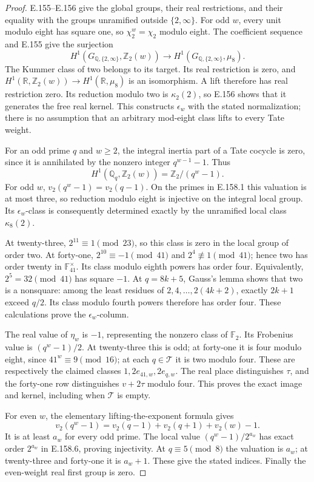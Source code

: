 \begin{proof}
E.155--E.156 give the global groups, their real restrictions,
and their equality with the groups unramified outside
\(\{2,\infty\}\). For odd \(w\), every unit modulo eight
has square one, so \(\chi_2^w=\chi_2\) modulo eight.
The coefficient sequence and E.155 give the surjection
\[
 H^1(G_{\mathbb Q,\{2,\infty\}},\mathbb Z_2(w))
       \longrightarrow
 H^1(G_{\mathbb Q,\{2,\infty\}},\mu_8).
 \tag{E.158.5}
\]
The Kummer class of two belongs to its target. Its real
restriction is zero, and
\(H^1(\mathbb R,\mathbb Z_2(w))\to H^1(\mathbb R,\mu_8)\)
is an isomorphism. A lift therefore has real restriction
zero. Its reduction modulo two is \(\kappa_2(2)\), so
E.156 shows that it generates the free real kernel.
This constructs \(\epsilon_w\) with the stated normalization;
there is no assumption that an arbitrary mod-eight class
lifts to every Tate weight.

For an odd prime \(q\) and \(w\ge2\), the integral inertia
part of a Tate cocycle is zero, since it is annihilated by
the nonzero integer \(q^{w-1}-1\). Thus
\[
 H^1(\mathbb Q_q,\mathbb Z_2(w))
       =\mathbb Z_2/(q^w-1).
 \tag{E.158.6}
\]
For odd \(w\), \(v_2(q^w-1)=v_2(q-1)\). On the primes
in E.158.1 this valuation is at most three, so reduction
modulo eight is injective on the integral local group.
Its \(\epsilon_w\)-class is consequently determined
exactly by the unramified local class \(\kappa_8(2)\).

At twenty-three, \(2^{11}\equiv1\pmod{23}\), so this
class is zero in the local group of order two.
At forty-one, \(2^{10}\equiv-1\pmod{41}\) and
\(2^4\not\equiv1\pmod{41}\); hence two has order twenty
in \(\mathbb F_{41}^{\times}\). Its class modulo eighth
powers has order four. Equivalently,
\(2^5=32\pmod{41}\) has square \(-1\).
At \(q=8k+5\), Gauss's lemma shows that two is a
nonsquare: among the least residues of \(2,4,\ldots,
2(4k+2)\), exactly \(2k+1\) exceed \(q/2\).
Its class modulo fourth powers therefore has order four.
These calculations prove the \(\epsilon_w\)-column.

The real value of \(\eta_w\) is \(-1\), representing
the nonzero class of \(\mathbb F_2\). Its Frobenius
value is \((q^w-1)/2\). At twenty-three this is odd;
at forty-one it is four modulo eight, since
\(41^w\equiv9\pmod{16}\); at each \(q\in\mathcal T\)
it is two modulo four. These are respectively the
claimed classes \(1,2e_{41,w},2e_{q,w}\).
The real place distinguishes \(\tau\), and the
forty-one row distinguishes \(v+2\tau\) modulo four.
This proves the exact image and kernel, including when
\(\mathcal T\) is empty.

For even \(w\), the elementary lifting-the-exponent
formula gives
\[
 v_2(q^w-1)=v_2(q-1)+v_2(q+1)+v_2(w)-1.
 \tag{E.158.7}
\]
It is at least \(a_w\) for every odd prime. The local
value \((q^w-1)/2^{a_w}\) has exact order \(2^{a_w}\)
in E.158.6, proving injectivity. At \(q\equiv5\pmod8\)
the valuation is \(a_w\); at twenty-three and forty-one
it is \(a_w+1\). These give the stated indices.
Finally the even-weight real first group is zero.
\end{proof}

